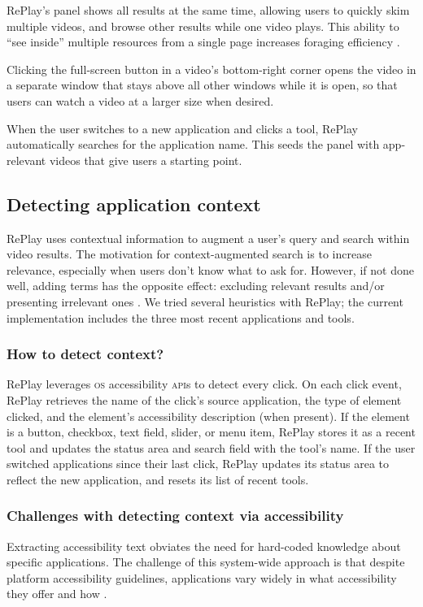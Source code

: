 RePlay's panel shows all results at the same time, allowing users to quickly skim multiple videos, and browse other results while one video plays. This ability to ``see inside'' multiple resources from a single page increases foraging efficiency \cite{Vermette2017, Glassman2016DocMatrix, Pavel2013}. 

Clicking the full-screen button in a video's bottom-right corner opens the video in a separate window that stays above all other windows while it is open, so that users can watch a video at a larger size when desired.

When the user switches to a new application and clicks a tool, RePlay automatically searches for the application name. This seeds the panel with app-relevant videos that give users a starting point.

\subsection{Detecting application context}
RePlay uses contextual information to augment a user's query and search within video results. The motivation for context-augmented search is to increase relevance, especially when users don't know what to ask for. However, if not done well, adding terms has the opposite effect: excluding relevant results and/or presenting irrelevant ones \cite{Finkelstein2002}. We tried several heuristics with RePlay; the current implementation includes the three most recent applications and tools.

\subsubsection{How to detect context?}
RePlay leverages \textsc{os} accessibility \textsc{api}s to detect every click. On each click event, RePlay retrieves the name of the click's source application, the type of element clicked, and the element's accessibility description (when present). If the element is a button, checkbox, text field, slider, or menu item, RePlay stores it as a recent tool and updates the status area and search field with the tool's name. If the user switched applications since their last click, RePlay updates its status area to reflect the new application, and resets its list of recent tools.

\subsubsection{Challenges with detecting context via accessibility}
Extracting accessibility text obviates the need for hard-coded knowledge about specific applications. The challenge of this system-wide approach is that despite platform accessibility guidelines, applications vary widely in what accessibility they offer and how \cite{Hurst2010}.

